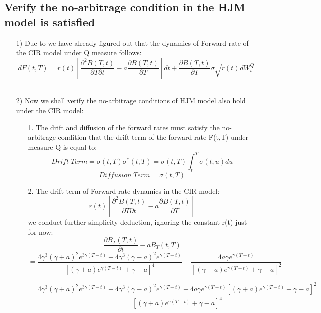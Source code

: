\documentclass[14pt]{extarticle}
\begin{document}
\subsection{Verify the no‐arbitrage condition in the HJM model is satisfied}
\begin{itemize}
    \item [1)]Due to we have already figured out that the dynamics of Forward rate of the CIR model under Q measure follows:
    $$ dF(t,T)=r(t)[\frac{ \partial^2 B(T,t) }{ \partial T \partial t} -a \frac{ \partial B(T,t) }{ \partial T}]dt +\frac{ \partial B(T,t) }{ \partial T}\sigma\sqrt{r(t)}dW_t^Q  $$
~\\
    \item[2)]Now we shall verify the no-arbitrage conditions of HJM model also hold under the CIR model:
    \begin{itemize}
         \item [1.] The drift and diffusion of the forward rates must satisfy the no-arbitrage condition that the drift term of the forward rate F(t,T) under measure Q is equal to:
    $$ Drift \; Term = \sigma(t,T)\sigma^*(t,T) =\sigma(t,T)\int_t^T \sigma(t,u) du$$ 
    $$ Diffusion \; Term=\sigma(t,T)$$
    \item[2.]The drift term of Forward rate dynamics in the CIR model:
    $$r(t)[\frac{ \partial^2 B(T,t) }{ \partial T \partial t} -a \frac{ \partial B(T,t) }{ \partial T}]$$
    we conduct further simplicity deduction, ignoring the constant r(t) just for now:
    $$ \frac{ \partial B_T(T,t) }{ \partial t}-aB_T(t,T) $$
    \newpage
    $$=\frac{4\gamma^3(\gamma+a)^2e^{3\gamma(T-t)}-4\gamma^3(\gamma-a)^2e^{\gamma(T-t)}} {[(\gamma+a) e^{\gamma(T-t)}+\gamma-a ]^4} -\frac{4a\gamma e^{\gamma(T-t)}} {[(\gamma+a) e^{\gamma(T-t)}+\gamma-a ]^2}$$
    
    $$= \frac{4\gamma^3(\gamma+a)^2e^{3\gamma(T-t)}-4\gamma^3(\gamma-a)^2e^{\gamma(T-t)}- 4a\gamma e^{\gamma(T-t)}[(\gamma+a)e^{\gamma(T-t)}+\gamma-a ]^2} {[(\gamma+a)e^{\gamma(T-t)}+\gamma-a ]^4}         $$
    

\end{itemize}
\end{itemize}
\end{document}
